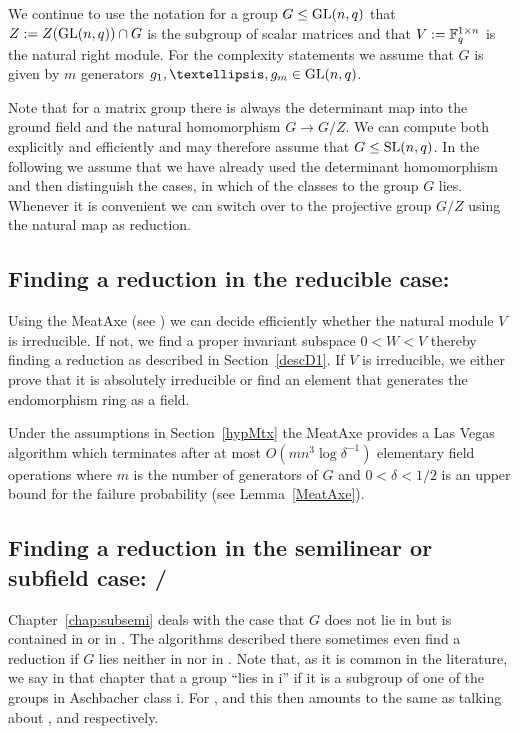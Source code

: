We continue to use the notation for a group $G \le \GL(n,q)$ that
$Z := Z(\GL(n,q)) \cap G$ is the subgroup of scalar matrices and that
$V := \mathbb{F}_q^{1 \times n}$ is the natural right module. For the
complexity statements we assume that $G$ is given by $m$ generators
$g_1, \ldots, g_m \in \GL(n,q)$.

Note that for a matrix group there is always the determinant map
into the ground field and the natural homomorphism
$G \to G/Z$. We can compute both explicitly and efficiently and may
therefore assume that $G \le \SL(n,q)$.
In the following we assume that we have already used the determinant
homomorphism and then distinguish the cases, in which of the classes
 to  the group $G$ lies. Whenever it is convenient we can
switch over to the projective group $G/Z$ using the natural map 
as reduction.

\subsection{Finding a reduction in the reducible case: }
\label{solveC1}

Using the MeatAxe (see \cite{MeatAxeHoltRees, IL, MeatAxeRP}) we can
decide efficiently whether the natural module $V$ is
irreducible. If not, we find a proper invariant subspace $0<W<V$
thereby finding a reduction as described in Section~\ref{descD1}. 
If $V$ is irreducible, we either prove
that it is absolutely irreducible or find an element that generates
the endomorphism ring as a field.

Under the assumptions in Section~\ref{hypMtx} the MeatAxe provides a
Las Vegas algorithm which terminates
after at most $O(mn^3\log \delta^{-1})$ elementary field operations where $m$
is the number of generators of $G$ and $0 < \delta < 1/2$ is an upper
bound for the failure probability (see Lemma~\ref{MeatAxe}).


\subsection{Finding a reduction in the semilinear or subfield case:
/}
\label{solveC3C5}

Chapter~\ref{chap:subsemi} deals with the case that $G$ does not lie
in  but is contained in  or in . The algorithms described
there sometimes even find a reduction if $G$ lies neither in  nor
in . Note that, as it is common in the literature, we say in that
chapter that a group ``lies in \CC i'' if it is a subgroup of one of
the groups in Aschbacher class \CC i. For ,  and  this then 
amounts to the same as talking about ,  and  respectively.

